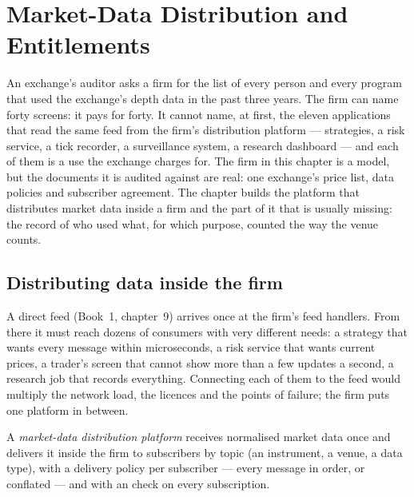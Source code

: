 \chapter{Market-Data Distribution and Entitlements}\label{ch:pl:market-data-distribution-and-entitlements}

An exchange's auditor asks a firm for the list of every person and every program that used the exchange's depth data in the past three years.
The firm can name forty screens: it pays for forty. It cannot name, at first, the eleven applications that read the same feed from the
firm's distribution platform --- strategies, a risk service, a tick recorder, a surveillance system, a research dashboard --- and each of them is
a use the exchange charges for. The firm in this chapter is a model, but the documents it is audited against are real: one exchange's price
list, data policies and subscriber agreement. The chapter builds the platform that distributes market data inside a firm and the part of it
that is usually missing: the record of who used what, for which purpose, counted the way the venue counts.

\section{Distributing data inside the firm}

A direct feed (Book~1, chapter~9) arrives once at the firm's feed handlers. From there it must reach dozens of consumers with very different
needs: a strategy that wants every message within microseconds, a risk service that wants current prices, a trader's screen that cannot show
more than a few updates a second, a research job that records everything. Connecting each of them to the feed would multiply the network
load, the licences and the points of failure; the firm puts one platform in between.

\begin{definition}\label{def:pl:market-data-distribution-and-entitlements:platform}
A \emph{market-data distribution platform} receives normalised market data once and delivers it
inside the firm to subscribers by topic (an instrument, a venue, a data type), with a delivery policy per subscriber --- every message in
order, or conflated --- and with an  check on every subscription.
\end{definition}

